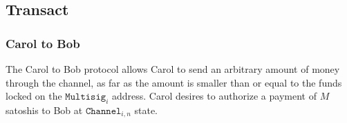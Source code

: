 \documentclass{llncs}
\begin{document}

\subsection{Transact}
\subsubsection{Carol to Bob} The Carol to Bob protocol allows Carol to send an
arbitrary amount of money through the channel, as far as the amount is smaller
than or equal to the funds locked on the $\texttt{Multisig}_i$ address. Carol
desires to authorize a payment of $M$ satoshis to Bob at
$\texttt{Channel}_{i,n}$ state.
\end{document}

